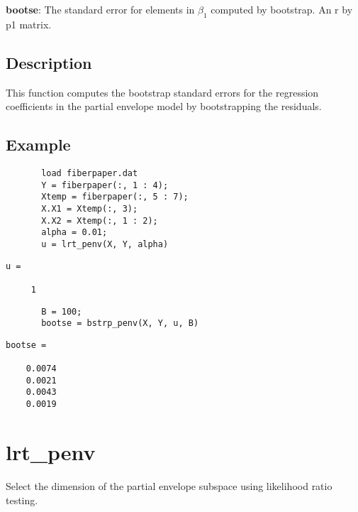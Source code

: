 \documentclass[a4paper,11pt,openany]{memoir}
\begin{document}
\begin{par}
\textbf{bootse}: The standard error for elements in $\beta_1$ computed by bootstrap.  An r by p1 matrix.
\end{par} \vspace{1em}


\subsection*{Description}

\begin{par}
This function computes the bootstrap standard errors for the regression coefficients in the partial envelope model by bootstrapping the residuals.
\end{par} \vspace{1em}


\subsection*{Example}


\begin{verbatim}       load fiberpaper.dat
       Y = fiberpaper(:, 1 : 4);
       Xtemp = fiberpaper(:, 5 : 7);
       X.X1 = Xtemp(:, 3);
       X.X2 = Xtemp(:, 1 : 2);
       alpha = 0.01;
       u = lrt_penv(X, Y, alpha)\end{verbatim}
               \color{lightgray}\ttfamily \begin{verbatim}
u =

     1
\end{verbatim} \rmfamily
\color{black}
\begin{verbatim}       B = 100;
       bootse = bstrp_penv(X, Y, u, B)\end{verbatim}
    
        \color{lightgray}\ttfamily \begin{verbatim}
bootse =

    0.0074
    0.0021
    0.0043
    0.0019

\end{verbatim} \rmfamily
\color{black}
    

\newpage


\rmfamily
\color{black}\section{lrt\_penv}

\begin{par}
Select the dimension of the partial envelope subspace using likelihood ratio testing.
\end{par} \vspace{1em}
\end{document}
